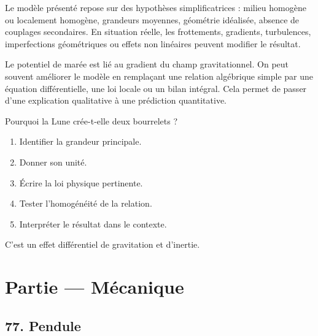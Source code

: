 \documentclass[11pt,a4paper]{article}
\begin{document}
\begin{attentionbox}
Le modèle présenté repose sur des hypothèses simplificatrices : milieu homogène ou localement homogène, grandeurs moyennes, géométrie idéalisée, absence de couplages secondaires. En situation réelle, les frottements, gradients, turbulences, imperfections géométriques ou effets non linéaires peuvent modifier le résultat.
\end{attentionbox}

\begin{approfondissementbox}
Le potentiel de marée est lié au gradient du champ gravitationnel.
On peut souvent améliorer le modèle en remplaçant une relation algébrique simple par une équation différentielle, une loi locale ou un bilan intégral. Cela permet de passer d'une explication qualitative à une prédiction quantitative.
\end{approfondissementbox}

\begin{exercicebox}
Pourquoi la Lune crée-t-elle deux bourrelets ?
\begin{enumerate}
  \item Identifier la grandeur principale.
  \item Donner son unité.
  \item Écrire la loi physique pertinente.
  \item Tester l'homogénéité de la relation.
  \item Interpréter le résultat dans le contexte.
\end{enumerate}
\end{exercicebox}

\begin{corrigebox}[Indication]
C'est un effet différentiel de gravitation et d'inertie.
\end{corrigebox}


\section{Partie — Mécanique}


\subsection{77. Pendule}
\end{document}
